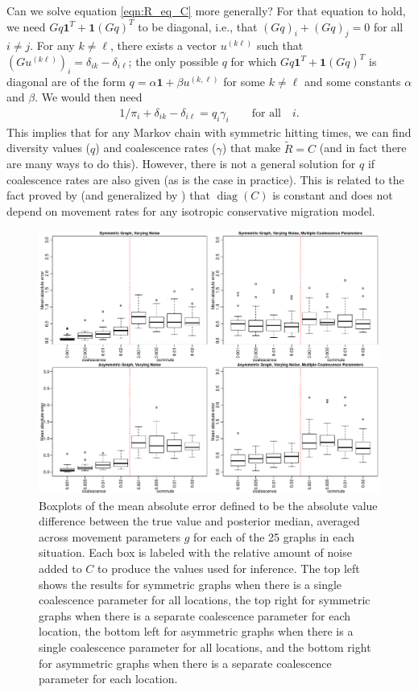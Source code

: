 \documentclass{article}
\newcommand{\comdist}{\widetilde{R}}
\DeclareMathOperator{\diag}{\mathop{\mbox{diag}}}
\newcommand{\bone}{\mathbf{1}}
\begin{document}
Can we solve equation \eqref{eqn:R_eq_C} more generally?
For that equation to hold, we need $Gq \bone^T + \bone (Gq)^T$ to be diagonal,
i.e., that $(Gq)_i + (Gq)_j = 0$ for all $i \neq j$.
For any $k \neq \ell$, there exists a vector $u^{(k\ell)}$ such that $(Gu^{(k\ell)})_i = \delta_{ik} - \delta_{i\ell}$;
the only possible $q$ for which $Gq \bone^T + \bone (Gq)^T$ is diagonal
are of the form $q = \alpha \bone + \beta u^{(k,\ell)}$ for some $k \neq \ell$ and some constants $\alpha$ and $\beta$.
We would then need
\begin{align}
    1/\pi_i + \delta_{ik} - \delta_{i\ell} = q_i \gamma_i \qquad \text{for all} \quad i.
\end{align}
This implies that for any Markov chain with symmetric hitting times,
we can find diversity values ($q$) and coalescence rates ($\gamma$) that make $\comdist = C$
(and in fact there are many ways to do this).
However, there is not a general solution for $q$ if coalescence rates are also given (as is the case in practice).
This is related to the fact proved by \citet{strobeck1987average} 
(and generalized by \citet{nagylaki1998expected}) 
that $\diag(C)$ is constant and does not depend on movement rates
for any isotropic conservative migration model.



\begin{figure}
\centering
\includegraphics[scale=.6]{figs/mult_noise}
\caption{Boxplots of the mean absolute error
defined to be the absolute value difference between the true value and posterior median,
averaged across movement parameters $g$ for each of the 25 graphs in each situation.
Each box is labeled with the relative amount of noise added to $C$ to produce the values used for inference.
The top left shows the results for symmetric graphs 
when there is a single coalescence parameter for all locations,
the top right for symmetric graphs 
when there is a separate coalescence parameter for each location,
the bottom left for asymmetric graphs 
when there is a single coalescence parameter for all locations,
and the bottom right for asymmetric graphs 
when there is a separate coalescence parameter for each location.}
\label{fig:mult_noise}
\end{figure}
\end{document}
